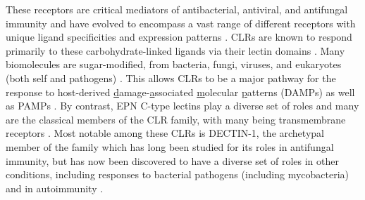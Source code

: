These receptors are critical mediators of antibacterial, antiviral, and antifungal immunity and have evolved to encompass a vast range of different receptors with unique ligand specificities and expression patterns \citep{Hoving2014, Tang2018}. CLRs are known to respond primarily to these carbohydrate\hyp{}linked ligands via their lectin domains \citep{McGreal2005, Dodd2001}. Many biomolecules are sugar\hyp{}modified, from bacteria, fungi, viruses, and eukaryotes (both self and pathogens) \citep{Rudd2001, Ohtsubo2006}. This allows CLRs to be a major pathway for the response to host\hyp{}derived \underline{d}amage\hyp{}\underline{a}ssociated \underline{m}olecular \underline{p}atterns (DAMPs) as well as PAMPs \citep{GarciaVallejo2009}. By contrast, EPN C\hyp{}type lectins play a diverse set of roles and many are the classical members of the CLR family, with many being transmembrane receptors \citep{Sancho2012}. Most notable among these CLRs is DECTIN\hyp{}1, the archetypal member of the family which has long been studied for its roles in antifungal immunity, but has now been discovered to have a diverse set of roles in other conditions, including responses to bacterial pathogens (including mycobacteria) and in autoimmunity \citep{Brown2002, Brown2003, Brown2006, Reid2009, Drummond2011b, Schorey2008, Yadav2006, Wagener2018, Deerhake2021}. 

